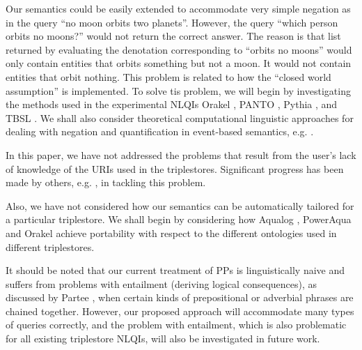 \documentclass[../main.tex]{subfiles}
\begin{document}
\begin{refsection}
Our semantics could be easily extended to accommodate very simple negation as in the query ``no moon orbits two planets''. However, the query ``which person orbits no moons?'' would not return the correct answer. The reason is that list returned by evaluating the denotation corresponding to ``orbits no moons'' would only contain entities that orbits something but not a moon. It would not contain entities that orbit nothing. This problem is related to how the ``closed world assumption'' is implemented. To solve tis problem, we will begin by investigating the methods used in the experimental NLQIs Orakel \cite{cimiano:haase}, PANTO \cite{wang2007panto}, Pythia \cite{unger:cimiano}, and TBSL \cite{hoffner2013user}. We shall also consider theoretical computational linguistic approaches for dealing with negation and quantification in event-based semantics, e.g. \cite{champollion2010quantification}.

In this paper, we have not addressed the problems that result from the user's lack of knowledge of the URIs used in the triplestores. Significant progress has been made by others, e.g. \cite{walter:unger}, in tackling this problem.

Also, we have not considered how our semantics can be automatically tailored for a particular triplestore. We shall begin by considering how Aqualog \cite{lopez:aqualog}, PowerAqua \cite{lopez:2012} and Orakel \cite{cimiano:haase} achieve portability with respect to the different ontologies used in different triplestores.

It should be noted that our current treatment of PPs is linguistically naive and suffers from problems with entailment (deriving logical consequences), as discussed by Partee \cite{partee2005formal}, when certain kinds of prepositional or adverbial phrases are chained together. However, our proposed approach will accommodate many types of queries correctly, and the problem with entailment, which is also problematic for all existing triplestore NLQIs, will also be investigated in future work.


\end{refsection}
\end{document}
